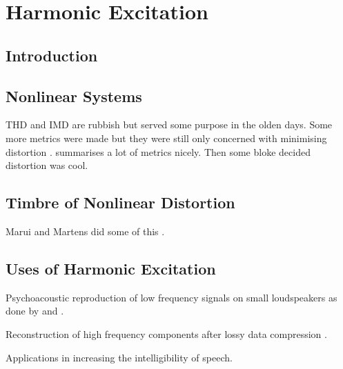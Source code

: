 
\chapter{Harmonic Excitation}
\label{chap:Excitation}

\section{Introduction}
\label{sec:Excitation-Introduction}

\section{Nonlinear Systems}
\label{sec:Excitation-NonlinearSystems}
	\note
	{
		THD and IMD are rubbish but served some purpose in the olden days. Some more metrics were made but they 
		were still only concerned with minimising distortion \citep{lee2003auditory, geddes2003auditory, 
		tan2004predicting}. \citet{voishvillo2006assessment} summarises a lot of metrics nicely. Then some bloke 
		decided distortion was cool.
	}

\section{Timbre of Nonlinear Distortion}
\label{sec:Excitation-Timbre}
	\note
	{
		Marui and Martens did some of this \citep{marui2005timbre, marui2005constructing, marui2005predicting}.
	}

\section{Uses of Harmonic Excitation}
\label{sec:Excitation-Uses}
	\note
	{
		Psychoacoustic reproduction of low frequency signals on small loudspeakers as done by 
		\citet{larsen2002reproducing} and \citet{gan2001virtual}.

		Reconstruction of high frequency components after lossy data compression \citep{friedrich2007spectral, 
		nagel2009a, nagel2010a, valin2000bandwidth, dietz2002spectral, larsen2002efficient, sha2010high}.

		Applications in increasing the intelligibility of speech.
	}

